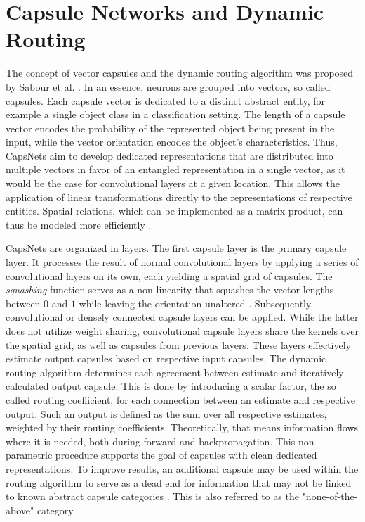 \documentclass{article}
\begin{document}
\section{Capsule Networks and Dynamic Routing}
\label{lab:capsules}
The concept of vector capsules and the dynamic routing algorithm was proposed by Sabour et al. .
In an essence, neurons are grouped into vectors, so called capsules. Each capsule vector is dedicated to a distinct abstract entity, for example a single object class in a classification setting. The length of a capsule vector encodes the probability of the represented object being present in the input, while the vector orientation encodes the object's characteristics. Thus, CapsNets aim to develop dedicated representations that are distributed into multiple vectors in favor of an entangled representation in a single vector, as it would be the case for convolutional layers at a given location.
This allows the application of linear transformations directly to the representations of respective entities. Spatial relations, which can be implemented as a matrix product, can thus be modeled more efficiently \cite{capsules}.

CapsNets are organized in layers. The first capsule layer is the primary capsule layer. It processes the result of normal convolutional layers by applying a series of convolutional layers on its own, each yielding a spatial grid of capsules. The \textit{squashing} function serves as a non-linearity that squashes the vector lengths between $0$ and $1$ while leaving the orientation unaltered \cite{capsules}.
Subsequently, convolutional or densely connected capsule layers can be applied. While the latter does not utilize weight sharing, convolutional capsule layers share the kernels over the spatial grid, as well as capsules from previous layers. 
These layers effectively estimate output capsules based on respective input capsules. The dynamic routing algorithm determines each agreement between estimate and iteratively calculated output capsule. This is done by introducing a scalar factor, the so called routing coefficient, for each connection between an estimate and respective output. Such an output is defined as the sum over all respective estimates, weighted by their routing coefficients. Theoretically, that means information flows where it is needed, both during forward and backpropagation. This non-parametric procedure supports the goal of capsules with clean dedicated representations. To improve results, an additional capsule may be used within the routing algorithm to serve as a dead end for information that may not be linked to known abstract capsule categories \cite{capsules}. This is also referred to as the "none-of-the-above" category.
\end{document}

